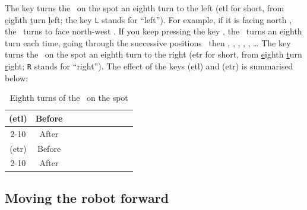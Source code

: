 The key  turns the \robot\ on the spot an eighth turn to the left
({\idt etl} for short, from
\underline{e}ighth \underline{t}urn \underline{l}eft; the key {\tt L} stands for ``left'').
For example, if it is facing north \robotCbN\/, the \robot\ turns to face
north-west \robotCbNW\/. If you keep pressing the key , the \robot\
turns an eighth turn each time, going through the successive positions
\robotCbW\ then \robotCbSW\/, \robotCbS\/, \robotCbSE\/, \robotCbE\/, \robotCbNE\/, \ldots
The key \touche{R} turns the \robot\ on the spot an eighth turn to the right
({\idt etr} for short, from
\underline{e}ighth \underline{t}urn \underline{r}ight; {\tt R} stands for ``right'').
The effect of the keys  \touche{L} ({\idt etl})  and \touche{R} ({\idt etr}) is summarised
\hbox{below:}
\begin{table}[htbp]
\begin{center}
\begin{tabular}{@{}|c|c|c|c|c|c|c|c|c|c|@{}} \hline
\touche{L} ({\idt etl}) & Before    & \robotCbN  & \robotCbNW & \robotCbW  & \robotCbSW & \robotCbS  & \robotCbSE & \robotCbE  & \robotCbNE \\ \cline{2-10}
                       & After  & \robotCbNW & \robotCbW  & \robotCbSW & \robotCbS  & \robotCbSE &\robotCbE   & \robotCbNE & \robotCbN  \\ \hline \hline
\touche{R} ({\idt etr}) & Before    & \robotCbN  & \robotCbNE & \robotCbE  & \robotCbSE & \robotCbS  & \robotCbSW & \robotCbW  & \robotCbNW \\ \cline{2-10}
                       & After & \robotCbNE & \robotCbE  & \robotCbSE & \robotCbS  & \robotCbSW & \robotCbW  & \robotCbNW & \robotCbN  \\ \hline
\end{tabular}
\end{center}
\caption{Eighth turns of the \protect\robot\ on the spot}
\end{table}

\subsection{Moving the robot forward}

